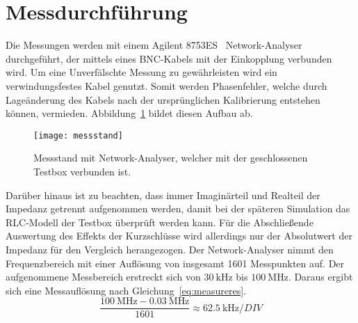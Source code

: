 \section{Messdurchf\"uhrung}
Die Messungen werden mit einem Agilent 8753ES~\cite{agilent2000} Network-Analyser durchgef\"uhrt, der mittels eines BNC-Kabels mit der Einkopplung verbunden wird. Um eine Unverf\"alschte Messung zu gew\"ahrleisten wird ein verwindungsfestes Kabel genutzt. Somit werden Phasenfehler, welche durch Lage\"anderung des Kabels nach der urspr\"unglichen Kalibrierung entstehen k\"onnen, vermieden. Abbildung~\ref{fig:messstand} bildet diesen Aufbau ab.
\par
\begin{figure}[htb]
	\centering
	\texttt{[image: messstand]}
	\caption{Messstand mit Network-Analyser, welcher mit der geschlossenen Testbox verbunden ist.}
	\label{fig:messstand}
\end{figure}

Dar\"uber hinaus ist zu beachten, dass immer Imagin\"arteil und Realteil der Impedanz getrennt aufgenommen werden, damit bei der sp\"ateren Simulation das RLC-Modell der Testbox \"uberpr\"uft werden kann. F\"ur die Abschlie\ss{}ende Auswertung des Effekts der Kurzschl\"usse wird allerdings nur der Absolutwert der Impedanz f\"ur den Vergleich herangezogen. Der Network-Analyser nimmt den Frequenzbereich mit einer Aufl\"osung von insgesamt 1601 Messpunkten auf. Der aufgenommene Messbereich erstreckt sich von $\SI{30}{\kilo\hertz}$ bis $\SI{100}{\mega\hertz}$. Daraus ergibt sich eine Messaufl\"osung nach Gleichung~\ref{eq:measureres}.
\begin{equation}
	\frac{\SI{100}{\mega\hertz} - \SI{0,03}{\mega\hertz} }{1601} \approx \SI{62,5}{\kilo\hertz\per DIV} 
	\label{eq:measureres}
\end{equation}


